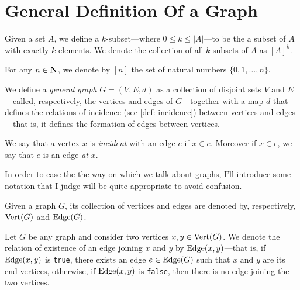 \section{General Definition Of a Graph}

\begin{notation}[\(k\)-subsets]
Given a set \(A\), we define a \(k\)-subset---where \(0 \leq k \leq |A|\)---to
be the a subset of \(A\) with exactly \(k\) elements. We denote the collection
of all \(k\)-subsets of \(A\) as \([A]^k\).
\end{notation}

\begin{notation}[Range]
For any \(n \in \mathbf{N}\), we denote by \([n]\) the set of natural numbers
\(\{0, 1, \dots, n\}\).
\end{notation}

\begin{definition}\label{def: general-graph}
We define a \emph{general graph} \(G = (V, E, d)\) as a collection of disjoint
sets \(V\) and \(E\)---called, respectively, the vertices and edges of
\(G\)---together with a map \(d\) that defines the relations of incidence (see
\cref{def: incidence}) between vertices and edges---that is, it defines the
formation of edges between vertices.
\end{definition}

\begin{definition}[Incidence]\label{def: incidence}
We say that a vertex \(x\) is \emph{incident} with an edge \(e\) if \(x \in
e\). Moreover if \(x \in e\), we say that \(e\) is an edge \emph{at} \(x\).
\end{definition}

In order to ease the the way on which we talk about graphs, I'll introduce some
notation that I judge will be quite appropriate to avoid confusion.

\begin{notation}
Given a graph \(G\), its collection of vertices and edges are denoted by,
respectively, \(\operatorname{Vert}(G)\) and \(\operatorname{Edge}(G)\).
\end{notation}

\begin{notation}
Let \(G\) be any graph and consider two vertices \(x, y \in \operatorname{Vert}(G)\). We
denote the relation of existence of an edge joining \(x\) and \(y\) by
\(\operatorname{Edge}(x, y)\)---that is, if \(\operatorname{Edge}(x, y)\) is \texttt{true}, there exists
an edge \(e \in \operatorname{Edge}(G)\) such that \(x\) and \(y\) are its end-vertices,
otherwise, if \(\operatorname{Edge}(x, y)\) is \texttt{false}, then there is no edge joining
the two vertices.
\end{notation}

